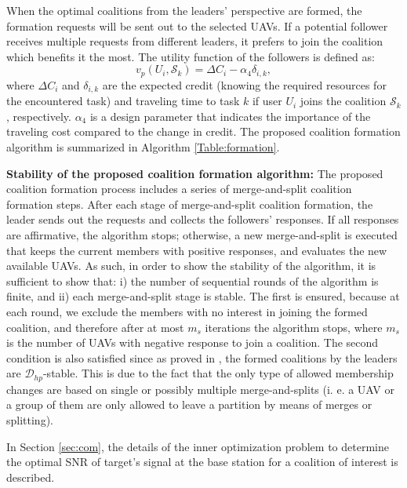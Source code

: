 \documentclass[conference]{IEEEtran}
\theoremstyle{remark}
\theoremstyle{lemma}
\begin{document}
When the optimal coalitions from the leaders' perspective are formed, the formation requests will be sent out to the selected UAVs. If a potential follower receives multiple requests from different leaders, it prefers to join the coalition which benefits it the most. The utility function of the followers is defined as:
\begin{equation} \label{follower_utility}
  v_p(U_i,\mathcal{S}_k) = \Delta{C_i} - \alpha_4 \delta_{i,k},
\end{equation}
where $\Delta{C_i}$ and $\delta_{i,k}$ are the expected credit (knowing the required resources for the encountered task) and traveling time to task $k$ if user $U_i$ joins the coalition $\mathcal{S}_k$, respectively. $\alpha_4$ is a design parameter that indicates the importance of the traveling cost compared to the change in credit. The proposed coalition formation algorithm is summarized in Algorithm \ref{Table:formation}.

\textbf{Stability of the proposed coalition formation algorithm:} The proposed coalition formation process includes a series of merge-and-split coalition formation steps. After each stage of merge-and-split coalition formation, the leader sends out the requests and collects the followers' responses. If all responses are affirmative, the algorithm stops; otherwise, a new merge-and-split is executed that keeps the current members with positive responses, and evaluates the new available UAVs. As such, in order to show the stability of the algorithm, it is sufficient to show that: i) the number of sequential rounds of the algorithm is finite, and ii) each merge-and-split stage is stable. The first is ensured, because at each round, we exclude the members with no interest in joining the formed coalition, and therefore after at most $m_s$ iterations the algorithm stops, where $m_s$ is the number of UAVs with negative response to join a coalition. The second condition is also satisfied since as proved in \cite{Apt}, the formed coalitions by the leaders are $\mathcal{D}_{hp}$-stable. This is due to the fact that the only type of allowed membership changes are based on single or possibly multiple merge-and-splits (i. e. a UAV or a group of them are only allowed to leave a partition by means of merges or splitting).

In Section \ref{sec:com}, the details of the inner optimization problem to determine the optimal SNR of target's signal at the base station for a coalition of interest is described. 
\end{document}
